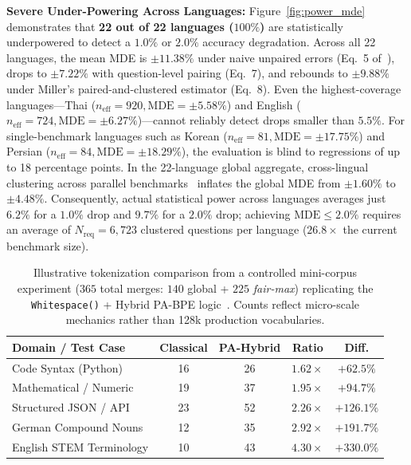 \textbf{Severe Under-Powering Across Languages:} Figure~\ref{fig:power_mde} demonstrates that \textbf{22 out of 22 languages ($100\%$)} are statistically underpowered to detect a $1.0\%$ or $2.0\%$ accuracy degradation. Across all 22 languages, the mean MDE is $\pm 11.38\%$ under naive unpaired errors (Eq.~5 of~\cite{miller2024adding}), drops to $\pm 7.22\%$ with question-level pairing (Eq.~7), and rebounds to $\mathbf{\pm 9.88\%}$ under Miller's paired-and-clustered estimator (Eq.~8). Even the highest-coverage languages---Thai ($n_{\mathrm{eff}} = 920, \mathrm{MDE} = \pm 5.58\%$) and English ($n_{\mathrm{eff}} = 724, \mathrm{MDE} = \pm 6.27\%$)---cannot reliably detect drops smaller than $5.5\%$. For single-benchmark languages such as Korean ($n_{\mathrm{eff}} = 81, \mathrm{MDE} = \pm 17.75\%$) and Persian ($n_{\mathrm{eff}} = 84, \mathrm{MDE} = \pm 18.29\%$), the evaluation is blind to regressions of up to 18 percentage points. In the 22-language global aggregate, cross-lingual clustering across parallel benchmarks~\cite{nllb2022no} inflates the global MDE from $\pm 1.60\%$ to $\mathbf{\pm 4.48\%}$. Consequently, actual statistical power across languages averages just $6.2\%$ for a $1.0\%$ drop and $9.7\%$ for a $2.0\%$ drop; achieving $\mathrm{MDE} \le 2.0\%$ requires an average of $N_{\mathrm{req}}=6{,}723$ clustered questions per language ($26.8\times$ the current benchmark size).

\begin{table}[t]
\centering
\caption{Illustrative tokenization comparison from a controlled mini-corpus experiment ($365$ total merges: $140$ global + $225$ \textit{fair-max}) replicating the \texttt{Whitespace()} + Hybrid PA-BPE logic~\cite{foroutan2026parity}. Counts reflect micro-scale mechanics rather than 128k production vocabularies.}
\vspace{-0.6em}
\footnotesize
\setlength{\tabcolsep}{2.8pt}
\begin{tabular}{lcccc}
\toprule
\textbf{Domain / Test Case} & \textbf{Classical} & \textbf{PA-Hybrid} & \textbf{Ratio} & \textbf{Diff.} \\
\midrule
Code Syntax (Python)       & 16 & 26 & $1.62\times$ & $+62.5\%$  \\
Mathematical / Numeric     & 19 & 37 & $1.95\times$ & $+94.7\%$  \\
Structured JSON / API      & 23 & 52 & $2.26\times$ & $+126.1\%$ \\
German Compound Nouns      & 12 & 35 & $2.92\times$ & $+191.7\%$ \\
English STEM Terminology   & 10 & 43 & $4.30\times$ & $+330.0\%$ \\
\bottomrule
\end{tabular}
\vspace{-0.8em}
\label{tab:failure_modes}
\end{table}

